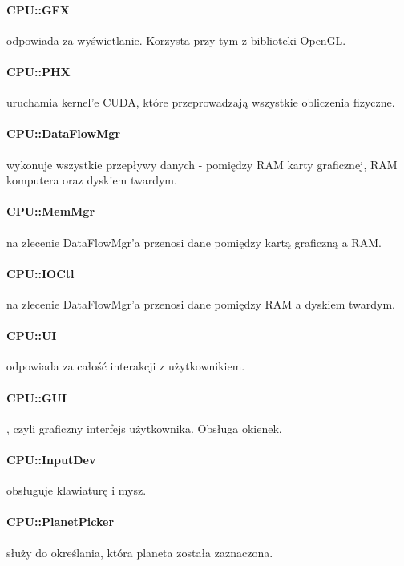 \paragraph{CPU::GFX} odpowiada za wyświetlanie. Korzysta przy tym z biblioteki OpenGL.
\paragraph{CPU::PHX} uruchamia kernel'e CUDA, które przeprowadzają wszystkie obliczenia fizyczne.
\paragraph{CPU::DataFlowMgr} wykonuje wszystkie przepływy danych - pomiędzy RAM karty graficznej, RAM komputera oraz dyskiem twardym.
\paragraph{CPU::MemMgr} na zlecenie DataFlowMgr'a przenosi dane pomiędzy kartą graficzną a RAM.
\paragraph{CPU::IOCtl} na zlecenie DataFlowMgr'a przenosi dane pomiędzy RAM a dyskiem twardym.
\paragraph{CPU::UI} odpowiada za całość interakcji z użytkownikiem.
\paragraph{CPU::GUI}, czyli graficzny interfejs użytkownika. Obsługa okienek.
\paragraph{CPU::InputDev} obsługuje klawiaturę i mysz.
\paragraph{CPU::PlanetPicker} służy do określania, która planeta została zaznaczona.
